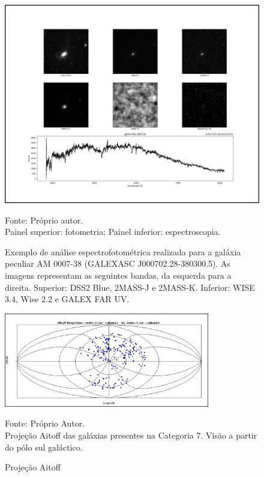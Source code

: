 \begin{figure}[!h]
	\centering	
    \caption{Exemplo de análise espectrofotométrica realizada para a galáxia peculiar AM 0007-38 (GALEXASC J000702.28-380300.5). As imagens representam as seguintes bandas, da esquerda para a direita. Superior: DSS2 Blue, 2MASS-J e 2MASS-K. Inferior: WISE 3.4, Wise 2.2 e GALEX FAR UV.}
    \includegraphics[width=1.0\textwidth]{figuras/fig5.png}
   	\begin{center}
        \normalsize  Fonte: Próprio autor. \\Painel superior: fotometria; Painel inferior: espectroscopia.
        \end{center}
	\label{fig:mosaic-spec}
\end{figure}

\begin{figure}[!htb]
	\centering	
    \caption{Projeção Aitoff}
    \includegraphics[width=0.8\textwidth]{figuras/southpole.png}
   	\begin{center}
        \normalsize Fonte: Próprio Autor.\\Projeção Aitoff das galáxias presentes na Categoria 7. Visão a partir do pólo sul galáctico.
    \end{center}
	\label{fig:aitoff}
\end{figure}

